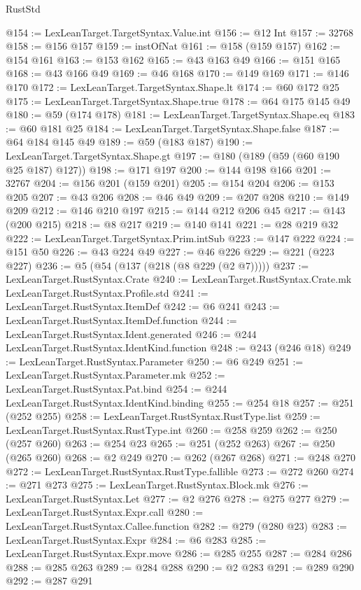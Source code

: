 \begin{lexlean}{RustStd}
\begin{coremodule}
@154 := LexLeanTarget.TargetSyntax.Value.int
@156 := @12 Int
@157 := 32768
@158 := @156 @157
@159 := instOfNat
@161 := @158 (@159 @157)
@162 := @154 @161
@163 := @153 @162
@165 := @43 @163 @49
@166 := @151 @165
@168 := @43 @166 @49
@169 := @46 @168
@170 := @149 @169
@171 := @146 @170
@172 := LexLeanTarget.TargetSyntax.Shape.lt
@174 := @60 @172 @25
@175 := LexLeanTarget.TargetSyntax.Shape.true
@178 := @64 @175 @145 @49
@180 := @59 (@174 @178)
@181 := LexLeanTarget.TargetSyntax.Shape.eq
@183 := @60 @181 @25
@184 := LexLeanTarget.TargetSyntax.Shape.false
@187 := @64 @184 @145 @49
@189 := @59 (@183 @187)
@190 := LexLeanTarget.TargetSyntax.Shape.gt
@197 := @180 (@189 (@59 (@60 @190 @25 @187) @127))
@198 := @171 @197
@200 := @144 @198 @166
@201 := 32767
@204 := @156 @201 (@159 @201)
@205 := @154 @204
@206 := @153 @205
@207 := @43 @206
@208 := @46 @49
@209 := @207 @208
@210 := @149 @209
@212 := @146 @210 @197
@215 := @144 @212 @206 @45
@217 := @143 (@200 @215)
@218 := @8 @217
@219 := @140 @141
@221 := @28 @219 @32
@222 := LexLeanTarget.TargetSyntax.Prim.intSub
@223 := @147 @222
@224 := @151 @50
@226 := @43 @224 @49
@227 := @46 @226
@229 := @221 (@223 @227)
@236 := @5 (@54 (@137 (@218 (@8 @229 (@2 @7)))))
@237 := LexLeanTarget.RustSyntax.Crate
@240 := LexLeanTarget.RustSyntax.Crate.mk LexLeanTarget.RustSyntax.Profile.std
@241 := LexLeanTarget.RustSyntax.ItemDef
@242 := @6 @241
@243 := LexLeanTarget.RustSyntax.ItemDef.function
@244 := LexLeanTarget.RustSyntax.Ident.generated
@246 := @244 LexLeanTarget.RustSyntax.IdentKind.function
@248 := @243 (@246 @18)
@249 := LexLeanTarget.RustSyntax.Parameter
@250 := @6 @249
@251 := LexLeanTarget.RustSyntax.Parameter.mk
@252 := LexLeanTarget.RustSyntax.Pat.bind
@254 := @244 LexLeanTarget.RustSyntax.IdentKind.binding
@255 := @254 @18
@257 := @251 (@252 @255)
@258 := LexLeanTarget.RustSyntax.RustType.list
@259 := LexLeanTarget.RustSyntax.RustType.int
@260 := @258 @259
@262 := @250 (@257 @260)
@263 := @254 @23
@265 := @251 (@252 @263)
@267 := @250 (@265 @260)
@268 := @2 @249
@270 := @262 (@267 @268)
@271 := @248 @270
@272 := LexLeanTarget.RustSyntax.RustType.fallible
@273 := @272 @260
@274 := @271 @273
@275 := LexLeanTarget.RustSyntax.Block.mk
@276 := LexLeanTarget.RustSyntax.Let
@277 := @2 @276
@278 := @275 @277
@279 := LexLeanTarget.RustSyntax.Expr.call
@280 := LexLeanTarget.RustSyntax.Callee.function
@282 := @279 (@280 @23)
@283 := LexLeanTarget.RustSyntax.Expr
@284 := @6 @283
@285 := LexLeanTarget.RustSyntax.Expr.move
@286 := @285 @255
@287 := @284 @286
@288 := @285 @263
@289 := @284 @288
@290 := @2 @283
@291 := @289 @290
@292 := @287 @291

\end{coremodule}
\end{lexlean}
